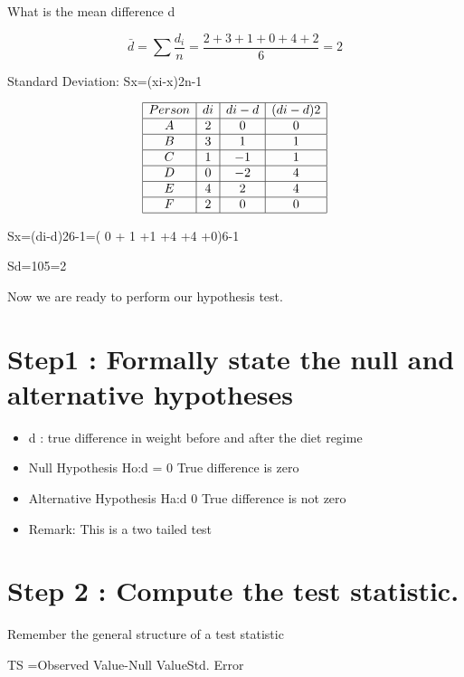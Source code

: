 \documentclass[]{report}
\begin{document}


What is the mean difference d


\[\bar{d}=\sum \frac{d_i}{n}= \frac{2+3+1+0+4+2}{6}= 2\]



Standard Deviation:           Sx=(xi-x)2n-1      

\[
\begin{array}{|c|c|c|c|} \hline
Person&di&di-d&(di-d)2\\ \hline
A&2&0&0\\ \hline
B&3&1&1\\ \hline
C&1&-1&1\\ \hline
D&0&-2&4\\ \hline
E&4&2&4\\ \hline
F&2&0&0\\ \hline
\end{array} 
\]

Sx=(di-d)26-1=( 0 + 1 +1 +4 +4 +0)6-1

Sd=105=2 

Now we are ready to perform our hypothesis test.


\section{Step1 : Formally state the null and alternative hypotheses}

\begin{itemize}
\item d : true difference in weight before and after the diet regime 

\item Null Hypothesis               Ho:d = 0        True difference is zero

\item Alternative Hypothesis      Ha:d 0       True difference is not zero 

\item Remark: This is a two tailed test
\end{itemize}



\section{Step 2 : Compute the test statistic.}


Remember the general structure of a test statistic

TS =Observed Value-Null ValueStd. Error 
\end{document}
